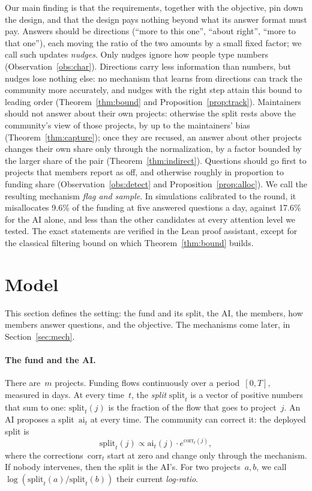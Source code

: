 \documentclass[doubleblind]{ecai}
\theoremstyle{remark}
\newcommand{\Split}{\mathrm{split}}
\newcommand{\ai}{\mathrm{ai}}
\newcommand{\corr}{\mathrm{corr}}
\begin{document}
Our main finding is that the requirements, together with the objective, pin down the design, and that the design pays nothing beyond what its answer format must pay. Answers should be directions (``more to this one'', ``about right'', ``more to that one''), each moving the ratio of the two amounts by a small fixed factor; we call such updates \emph{nudges}. Only nudges ignore how people type numbers (Observation~\ref{obs:char}). Directions carry less information than numbers, but nudges lose nothing else: no mechanism that learns from directions can track the community more accurately, and nudges with the right step attain this bound to leading order (Theorem~\ref{thm:bound} and Proposition~\ref{prop:track}). Maintainers should not answer about their own projects: otherwise the split rests above the community's view of those projects, by up to the maintainers' bias (Theorem~\ref{thm:capture}); once they are recused, an answer about other projects changes their own share only through the normalization, by a factor bounded by the larger share of the pair (Theorem~\ref{thm:indirect}). Questions should go first to projects that members report as off, and otherwise roughly in proportion to funding share (Observation~\ref{obs:detect} and Proposition~\ref{prop:alloc}). We call the resulting mechanism \emph{flag and sample}. In simulations calibrated to the round, it misallocates 9.6\% of the funding at five answered questions a day, against 17.6\% for the AI alone, and less than the other candidates at every attention level we tested. The exact statements are verified in the Lean proof assistant, except for the classical filtering bound on which Theorem~\ref{thm:bound} builds.

\section{Model}\label{sec:model}

This section defines the setting: the fund and its split, the AI, the members, how members answer questions, and the objective. The mechanisms come later, in Section~\ref{sec:mech}.

\paragraph{The fund and the AI.}
There are~$m$ projects. Funding flows continuously over a period~$[0,T]$, measured in days. At every time~$t$, the \emph{split} $\Split_t$ is a vector of positive numbers that sum to one: $\Split_t(j)$ is the fraction of the flow that goes to project~$j$. An AI proposes a split~$\ai_t$ at every time. The community can correct it: the deployed split is
\[
\Split_t(j) \propto \ai_t(j)\cdot e^{\corr_t(j)},
\]
where the corrections~$\corr_t$ start at zero and change only through the mechanism. If nobody intervenes, then the split is the AI's. For two projects~$a,b$, we call $\log(\Split_t(a)/\Split_t(b))$ their current \emph{log-ratio}.
\end{document}

